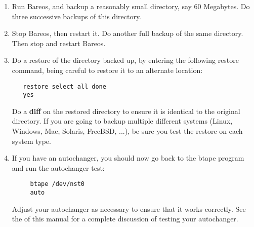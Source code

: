 \begin{enumerate}
\item Run Bareos, and backup a reasonably small directory, say 60
   Megabytes.  Do three successive backups of this directory.

\item Stop Bareos, then restart it.  Do another full backup of the same
   directory.  Then stop and restart Bareos.

\item Do a restore of the directory backed up, by entering the  following
   restore command, being careful to restore it to  an alternate location:


\footnotesize
\begin{verbatim}
   restore select all done
   yes

\end{verbatim}
\normalsize

   Do a {\bf diff} on the restored directory to ensure it is identical  to the
   original directory. If you are going to backup multiple different systems
   (Linux, Windows, Mac, Solaris, FreeBSD, ...), be sure you test the restore
   on each system type.

\item If you have an autochanger, you should now go back to the  btape program
   and run the autochanger test:

\footnotesize
\begin{verbatim}
     btape /dev/nst0
     auto
\end{verbatim}
\normalsize

   Adjust your autochanger as necessary to ensure that it works  correctly. See
   the  of this manual  for a complete discussion of testing
   your autochanger.

\end{enumerate}

